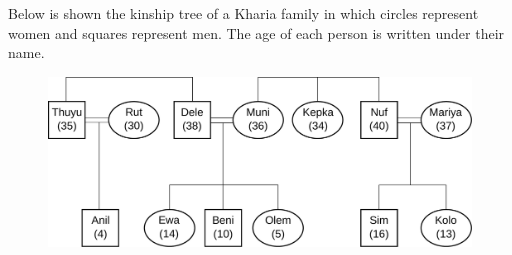 \begin{refsection}
\begin{problem}{\langnameKharia}{\nameBDohnalova}{}
Below is shown the kinship tree of a Kharia family in which circles represent women and squares represent men. The age of each person is written under their name.
\vfill
\begin{figure}[H]
\includegraphics[width = \linewidth]{figures/Kharia.pdf}
\end{figure}
\vfill\pagebreak


\end{problem}
\end{refsection}
